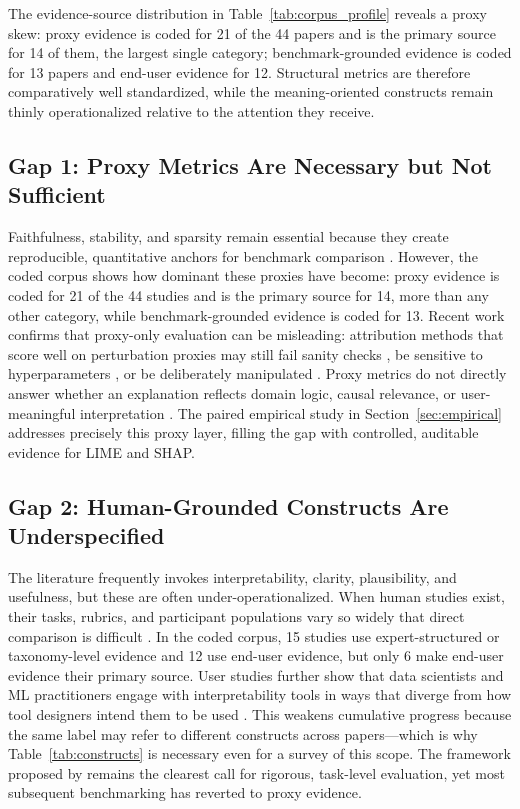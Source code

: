 \documentclass[twoside,11pt]{article}
\begin{document}
The evidence-source distribution in Table~\ref{tab:corpus_profile}
reveals a proxy skew: proxy evidence is coded for 21 of the 44 papers and is
the primary source for 14 of them, the largest single category; benchmark-grounded
evidence is coded for 13 papers and end-user evidence for 12. Structural metrics
are therefore comparatively well standardized, while the meaning-oriented
constructs remain thinly operationalized relative to the attention they
receive.

\subsection{Gap 1: Proxy Metrics Are Necessary but Not Sufficient}

Faithfulness, stability, and sparsity remain essential because they create
reproducible, quantitative anchors for benchmark comparison
\citep{agarwal2022openxai,hedstrom2023quantus,canha2025benchmark,
nauta2023anecdotal,burkart2021survey}. However, the coded corpus shows
how dominant these proxies have become: proxy evidence is coded for 21 of the
44 studies and is the primary source for 14, more than any other category,
while benchmark-grounded evidence is coded for 13. Recent work
confirms that proxy-only evaluation can be misleading: attribution
methods that score well on perturbation proxies may still fail sanity
checks \citep{adebayo2018sanity}, be sensitive to hyperparameters
\citep{alvarezmelis2018robustness}, or be deliberately manipulated
\citep{slack2020fooling}. Proxy metrics do not directly answer whether
an explanation reflects domain logic, causal relevance, or
user-meaningful interpretation \citep{kumar2020problems,
doshivelez2017rigorous}. The paired empirical study in
Section~\ref{sec:empirical} addresses precisely this proxy layer,
filling the gap with controlled, auditable evidence for LIME and SHAP.

\subsection{Gap 2: Human-Grounded Constructs Are Underspecified}

The literature frequently invokes interpretability, clarity, plausibility,
and usefulness, but these are often under-operationalized. When human
studies exist, their tasks, rubrics, and participant populations vary so
widely that direct comparison is difficult
\citep{ali2023trustworthy,longo2024manifesto,mohseni2021survey}. In the
coded corpus, 15 studies use expert-structured or taxonomy-level evidence and
12 use end-user evidence, but only 6 make end-user evidence their primary
source. User studies further show that data
scientists and ML practitioners engage with interpretability tools in ways
that diverge from how tool designers intend them to be used
\citep{kaur2020interpreting,hase2020evaluating,bucinca2020proxy}. This
weakens cumulative progress because the same label may refer to different
constructs across papers---which is why Table~\ref{tab:constructs} is
necessary even for a survey of this scope. The framework proposed by
\citet{doshivelez2017rigorous} remains the clearest call for rigorous,
task-level evaluation, yet most subsequent benchmarking has reverted to
proxy evidence.
\end{document}
